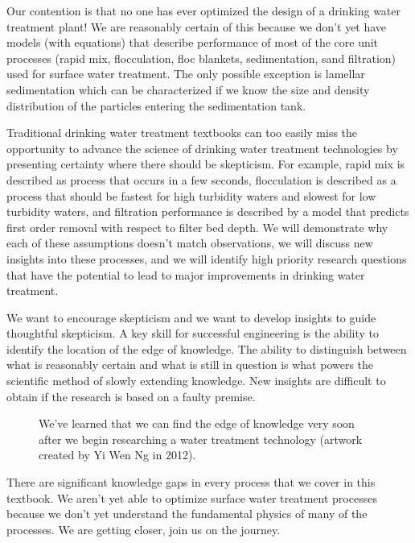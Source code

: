 \documentclass[letterpaper,10pt,english]{sphinxmanual}
\let\sphinxpxdimen\pdfpxdimen\else\newdimen\sphinxpxdimen
\begin{document}
Our contention is that no one has ever optimized the design of a drinking water treatment plant! We are reasonably certain of this because we don’t yet have models (with equations) that describe performance of most of the core unit processes (rapid mix, flocculation, floc blankets, sedimentation, sand filtration) used for surface water treatment. The only possible exception is lamellar sedimentation which can be characterized if we know the size and density distribution of the particles entering the sedimentation tank.

Traditional drinking water treatment textbooks can too easily miss the opportunity to advance the science of drinking water treatment technologies by presenting certainty where there should be skepticism. For example, rapid mix is described as process that occurs in a few seconds, flocculation is described as a process that should be fastest for high turbidity waters and slowest for low turbidity waters, and filtration performance is described by a model that predicts first order removal with respect to filter bed depth. We will demonstrate why each of these assumptions doesn’t match observations, we will discuss new insights into these processes, and we will identify high priority research questions that have the potential to lead to major improvements in drinking water treatment.

We want to encourage skepticism and we want to develop insights to guide thoughtful skepticism. A key skill for successful engineering is the ability to identify the location of the edge of knowledge. The ability to distinguish between what is reasonably certain and what is still in question is what powers the scientific method of slowly extending knowledge. New insights are difficult to obtain if the research  is based on a faulty premise.

\begin{figure}[htbp]
\centering
\capstart

\noindent\sphinxincludegraphics[width=500\sphinxpxdimen]{{Short_walk_to_the_edge}.jpg}
\caption{We’ve learned that we can find the edge of knowledge very soon after we begin researching a water treatment technology (artwork created by Yi Wen Ng in 2012).}\label{\detokenize{Introduction/Introduction:id11}}\label{\detokenize{Introduction/Introduction:figure-short-walk}}\end{figure}

There are significant knowledge gaps in every process that we cover in this textbook. We aren’t yet able to optimize surface water treatment processes because we don’t yet understand the fundamental physics of many of the processes. We are getting closer, join us on the journey.
\end{document}
